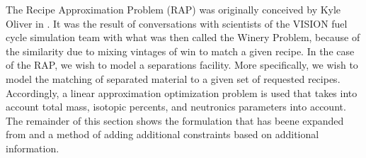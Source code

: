 The Recipe Approximation Problem (RAP) was originally conceived by Kyle Oliver
in \cite{oliver_geniusv2:_2009}. It was the result of conversations with
scientists of the VISION fuel cycle simulation team \cite{vision2009} with what
was then called the Winery Problem, because of the similarity due to mixing
vintages of win to match a given recipe. In the case of the RAP, we wish to
model a separations facility. More specifically, we wish to model the matching
of separated material to a given set of requested recipes. Accordingly, a linear
approximation optimization problem is used that takes into account total mass,
isotopic percents, and neutronics parameters into account. The remainder of this
section shows the formulation that has beene expanded from
\cite{oliver_geniusv2:_2009} and a method of adding additional constraints based
on additional information.
